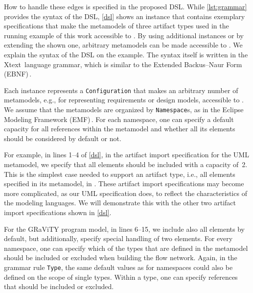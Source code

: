 How to handle these edges is specified in the proposed DSL.
While \autoref{lst:grammar} provides the syntax of the DSL, \autoref{dsl} shows an instance that contains exemplary specifications that make the metamodels of three artifact types used in the running example of this work accessible to \appr{}.
By using additional instances or by extending the shown one, arbitrary metamodels can be made accessible to \appr{}.
We explain the syntax of the DSL on the example.
The syntax itself is written in the Xtext\,\cite{xtext} language grammar, which is similar to the Extended Backus–Naur Form (EBNF)\,\cite{Yue2014}.

Each instance represents a \texttt{Configuration} that makes an arbitrary number of metamodels, e.g., for representing requirements or design models, accessible to \appr{}.
We assume that the metamodels are organized by \texttt{Namespace}s, as in the Eclipse Modeling Framework (EMF)\,\cite{steinberg2008emf}.
For each namespace, one can specify a default capacity for all references within the metamodel and whether all its elements should be considered by default or not.

For example, in lines 1--4 of \autoref{dsl}, in the artifact import specification for the UML metamodel, we specify that all elements should be included with a capacity of~2.
This is the simplest case needed to support an artifact type, i.e., all elements specified in its metamodel, in \appr{}.
These artifact import specifications may become more complicated, as our UML specification does, to reflect the characteristics of the modeling languages.
We will demonstrate this with the other two artifact import specifications shown in \autoref{dsl}.

For the GRaViTY program model, in lines 6--15, we include also all elements by default, but additionally, specify special handling of two elements.
For every namespace, one can specify which of the types that are defined in the metamodel should be included or excluded when building the flow network.
Again, in the grammar rule \texttt{Type}, the same default values as for namespaces could also be defined on the scope of single types.
Within a type, one can specify references that should be included or excluded.

